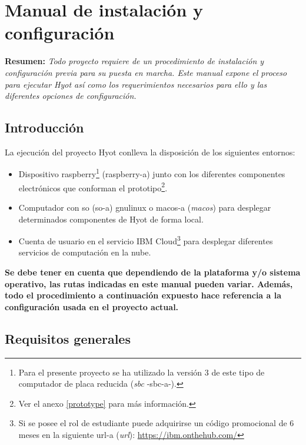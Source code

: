 \documentclass[12pt,a4paper, twoside]{report}
\begin{document}
	\chapter{Manual de instalación y configuración}\label{install}
	
	\textbf{Resumen:} \textit{Todo proyecto requiere de un procedimiento de instalación y configuración previa para su puesta en marcha. Este manual expone el proceso para ejecutar Hyot así como los requerimientos necesarios para ello y las diferentes opciones de configuración.}
		
	\section{Introducción}
	
	La ejecución del proyecto Hyot conlleva la disposición de los siguientes entornos:
	
	\begin{itemize}
		\item Dispositivo \gls{raspberry}\footnote{Para el presente proyecto se ha utilizado la versión 3 de este tipo de computador de placa reducida (\textit{\gls{sbc}} -\gls{sbc-a}-).} (\gls{raspberry-a}) junto con los diferentes componentes electrónicos que conforman el prototipo\footnote{Ver el anexo \ref{prototype} para más información.}.
		\item Computador con \gls{so} (\gls{so-a}) \gls{gnulinux} o \gls{macos-a} (\textit{\gls{macos}}) para desplegar determinados componentes de Hyot de forma local.
		\item Cuenta de usuario en el servicio IBM Cloud\footnote{Si se posee el rol de estudiante puede adquirirse un código promocional de 6 meses en la siguiente \gls{url-a} (\textit{\gls{url}}): \url{https://ibm.onthehub.com/}} \cite{ibmcloud:url} para desplegar diferentes servicios de computación en la nube.
	\end{itemize}
	
	\textbf{\color{red}Se debe tener en cuenta que dependiendo de la plataforma y/o sistema operativo, las rutas indicadas en este manual pueden variar. Además, todo el procedimiento a continuación expuesto hace referencia a la configuración usada en el proyecto actual.}
	
	\section{Requisitos generales}
	
\end{document}
